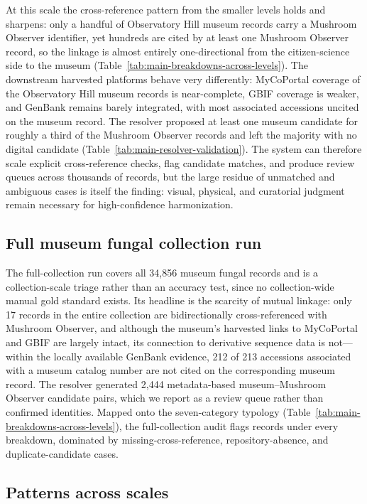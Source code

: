 At this scale the cross-reference pattern from the smaller levels holds and
sharpens: only a handful of Observatory Hill museum records carry a Mushroom
Observer identifier, yet hundreds are cited by at least one Mushroom Observer
record, so the linkage is almost entirely one-directional from the citizen-science
side to the museum (Table~\ref{tab:main-breakdowns-across-levels}). The downstream
harvested platforms behave very differently: MyCoPortal coverage of the
Observatory Hill museum records is near-complete, GBIF coverage is weaker, and
GenBank remains barely integrated, with most associated accessions uncited on the
museum record. The resolver proposed at least one museum candidate for roughly a
third of the Mushroom Observer records and left the majority with no digital
candidate (Table~\ref{tab:main-resolver-validation}). The system can therefore
scale explicit cross-reference checks, flag candidate matches, and produce review
queues across thousands of records, but the large residue of unmatched and
ambiguous cases is itself the finding: visual, physical, and curatorial judgment
remain necessary for high-confidence harmonization.

\subsection{Full museum fungal collection run}

The full-collection run covers all 34,856 museum fungal records and is a
collection-scale triage rather than an accuracy test, since no collection-wide
manual gold standard exists. Its headline is the scarcity of mutual linkage: only
17 records in the entire collection are bidirectionally cross-referenced with
Mushroom Observer, and although the museum's harvested links to MyCoPortal and
GBIF are largely intact, its connection to derivative sequence data is not---within
the locally available GenBank evidence, 212 of 213 accessions associated with a
museum catalog number are not cited on the corresponding museum record. The
resolver generated 2,444 metadata-based museum--Mushroom Observer candidate pairs,
which we report as a review queue rather than confirmed identities. Mapped onto the
seven-category typology (Table~\ref{tab:main-breakdowns-across-levels}), the
full-collection audit flags records under every breakdown, dominated by
missing-cross-reference, repository-absence, and duplicate-candidate cases.

\subsection{Patterns across scales}

